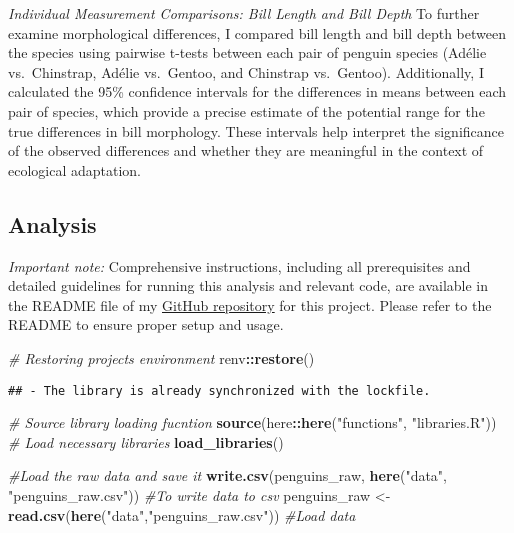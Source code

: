\documentclass[
]{article}
\newenvironment{Shaded}{\begin{snugshade}}{\end{snugshade}}
\newcommand{\CommentTok}[1]{\textcolor[rgb]{0.56,0.35,0.01}{\textit{#1}}}
\newcommand{\FunctionTok}[1]{\textcolor[rgb]{0.13,0.29,0.53}{\textbf{#1}}}
\newcommand{\NormalTok}[1]{#1}
\newcommand{\OtherTok}[1]{\textcolor[rgb]{0.56,0.35,0.01}{#1}}
\newcommand{\SpecialCharTok}[1]{\textcolor[rgb]{0.81,0.36,0.00}{\textbf{#1}}}
\newcommand{\StringTok}[1]{\textcolor[rgb]{0.31,0.60,0.02}{#1}}
\begin{document}
\emph{Individual Measurement Comparisons: Bill Length and Bill Depth} To
further examine morphological differences, I compared bill length and
bill depth between the species using pairwise t-tests between each pair
of penguin species (Adélie vs.~Chinstrap, Adélie vs.~Gentoo, and
Chinstrap vs.~Gentoo). Additionally, I calculated the 95\% confidence
intervals for the differences in means between each pair of species,
which provide a precise estimate of the potential range for the true
differences in bill morphology. These intervals help interpret the
significance of the observed differences and whether they are meaningful
in the context of ecological adaptation.

\subsection{Analysis}\label{analysis}

\emph{Important note:} Comprehensive instructions, including all
prerequisites and detailed guidelines for running this analysis and
relevant code, are available in the README file of my
\href{https://github.com/Biology3579/ReproducibleScienceAssignment.git}{GitHub
repository} for this project. Please refer to the README to ensure
proper setup and usage.

\begin{Shaded}
\begin{Highlighting}[]
\CommentTok{\# Restoring project\textquotesingle{}s environment }
\NormalTok{renv}\SpecialCharTok{::}\FunctionTok{restore}\NormalTok{()}
\end{Highlighting}
\end{Shaded}

\begin{verbatim}
## - The library is already synchronized with the lockfile.
\end{verbatim}

\begin{Shaded}
\begin{Highlighting}[]
\CommentTok{\# Source library loading fucntion}
\FunctionTok{source}\NormalTok{(here}\SpecialCharTok{::}\FunctionTok{here}\NormalTok{(}\StringTok{"functions"}\NormalTok{, }\StringTok{"libraries.R"}\NormalTok{))}
\CommentTok{\# Load necessary libraries}
\FunctionTok{load\_libraries}\NormalTok{()}
\end{Highlighting}
\end{Shaded}

\begin{Shaded}
\begin{Highlighting}[]
\CommentTok{\#Load the raw data and save it}
\FunctionTok{write.csv}\NormalTok{(penguins\_raw, }\FunctionTok{here}\NormalTok{(}\StringTok{"data"}\NormalTok{, }\StringTok{"penguins\_raw.csv"}\NormalTok{)) }\CommentTok{\#To write data to csv}
\NormalTok{penguins\_raw }\OtherTok{\textless{}{-}} \FunctionTok{read.csv}\NormalTok{(}\FunctionTok{here}\NormalTok{(}\StringTok{"data"}\NormalTok{,}\StringTok{"penguins\_raw.csv"}\NormalTok{)) }\CommentTok{\#Load data }
\end{Highlighting}
\end{Shaded}
\end{document}
